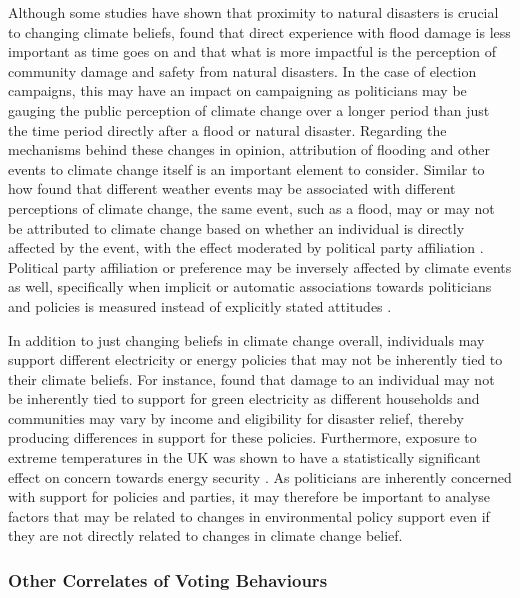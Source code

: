 \documentclass[preprint]{elsarticle} %
\begin{document}
Although some studies have shown that proximity to natural disasters is crucial to changing climate beliefs, \citet{albrightBeliefsClimateChange2019} found that direct experience with flood damage is less important as time goes on and that what is more impactful is the perception of community damage and safety from natural disasters. In the case of election campaigns, this may have an impact on campaigning as politicians may be gauging the public perception of climate change over a longer period than just the time period directly after a flood or natural disaster. Regarding the mechanisms behind these changes in opinion, attribution of flooding and other events to climate change itself is an important element to consider. Similar to how \citet{loComeRainShine2015} found that different weather events may be associated with different perceptions of climate change, the same event, such as a flood, may or may not be attributed to climate change based on whether an individual is directly affected by the event, with the effect moderated by political party affiliation \citep{ogunbodeIndividualLocalFlooding2020}. Political party affiliation or preference may be inversely affected by climate events as well, specifically when implicit or automatic associations towards politicians and policies is measured instead of explicitly stated attitudes \citep{rudmanWhenTruthPersonally2013a}. 

In addition to just changing beliefs in climate change overall, individuals may support different electricity or energy policies that may not be inherently tied to their climate beliefs. For instance, \citet{osberghausCausalEffectFlood2019} found that damage to an individual may not be inherently tied to support for green electricity as different households and communities may vary by income and eligibility for disaster relief, thereby producing differences in support for these policies. Furthermore, exposure to extreme temperatures in the UK was shown to have a statistically significant effect on concern towards energy security \citep{larcomUKSummerHeatwave2019a}. As politicians are inherently concerned with support for policies and parties, it may therefore be important to analyse factors that may be related to changes in environmental policy support even if they are not directly related to changes in climate change belief. 



\subsubsection{Other Correlates of Voting Behaviours}
\end{document}
